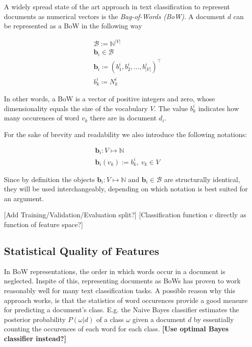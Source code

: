 A widely spread state of the art approach in text classification to represent
documents as numerical vectors is the \emph{Bag-of-Words (BoW)}.
A document $d$ can be represented as a BoW in the following way

\begin{eqnarray*}
	\mathcal{B} := \mathbb{N}^{|V|} \\
	\mathbf{b}_i \in \mathcal{B} \\
	\mathbf{b}_i \coloneqq (b_1^i, b_2^i, \ldots, b_{|V|}^i)^\intercal \\
	b_k^i \coloneqq N_k^i
\end{eqnarray*}
	
In other words, a BoW is a vector of positive integers and zero, whose
dimensionality equals the size of the vocabulary $V$. The value $b_k^i$
indicates how many occurences of word $v_k$ there are in document
$d_i$. 

For the sake of brevity and readability we also introduce the following
notations:

\begin{eqnarray*}
	\mathbf{b}_i: V \mapsto \mathbb{N} \\
	\mathbf{b}_i(v_k) := b_k^i,\ v_k \in V
\end{eqnarray*}

Since by definition the objects $\mathbf{b}_i: V \mapsto \mathbb{N}$ and
$\mathbf{b}_i \in \mathcal{B}$ are structurally identical, they will be used interchangeably, 
depending on which notation is best suited for an argument. 


[Add Training/Validation/Evaluation split?]
[Classification function c directly as function of feature space?]

 \subsection{Statistical Quality of Features}
 
In BoW representations, the order in which words occur in a document is
neglected. Inspite of this, representing documents as BoWs has proven
to work reasonably well for many text classification tasks. A possible reason why this approach works, is
that the statistics of word occurences provide a good measure for predicting a
document's class. E.g. the Naive Bayes classifier estimates the posterior
probability $P(\omega|d)$ of a class $\omega$ given a document $d$ by
essentially counting the occurences of each word for each class.
\textbf{[Use optimal Bayes classifier instead?]}

